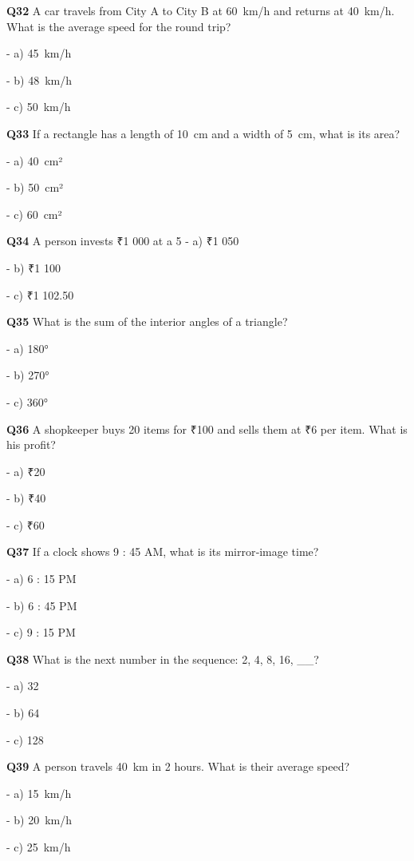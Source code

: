 \textbf{Q32} A car travels from City A to City B at 60 km/h and returns at 40 km/h. What is the average speed for the round trip?\par
\quad - a) 45 km/h\par
\quad - b) 48 km/h\par
\quad - c) 50 km/h\par

\textbf{Q33} If a rectangle has a length of 10 cm and a width of 5 cm, what is its area?\par
\quad - a) 40 cm²\par
\quad - b) 50 cm²\par
\quad - c) 60 cm²\par

\textbf{Q34} A person invests ₹1 000 at a 5 %
\quad - a) ₹1 050\par
\quad - b) ₹1 100\par
\quad - c) ₹1 102.50\par

\textbf{Q35} What is the sum of the interior angles of a triangle?\par
\quad - a) 180°\par
\quad - b) 270°\par
\quad - c) 360°\par

\textbf{Q36} A shopkeeper buys 20 items for ₹100 and sells them at ₹6 per item. What is his profit?\par
\quad - a) ₹20\par
\quad - b) ₹40\par
\quad - c) ₹60\par

\textbf{Q37} If a clock shows 9 : 45 AM, what is its mirror‑image time?\par
\quad - a) 6 : 15 PM\par
\quad - b) 6 : 45 PM\par
\quad - c) 9 : 15 PM\par

\textbf{Q38} What is the next number in the sequence: 2, 4, 8, 16, __?\par
\quad - a) 32\par
\quad - b) 64\par
\quad - c) 128\par

\textbf{Q39} A person travels 40 km in 2 hours. What is their average speed?\par
\quad - a) 15 km/h\par
\quad - b) 20 km/h\par
\quad - c) 25 km/h\par

